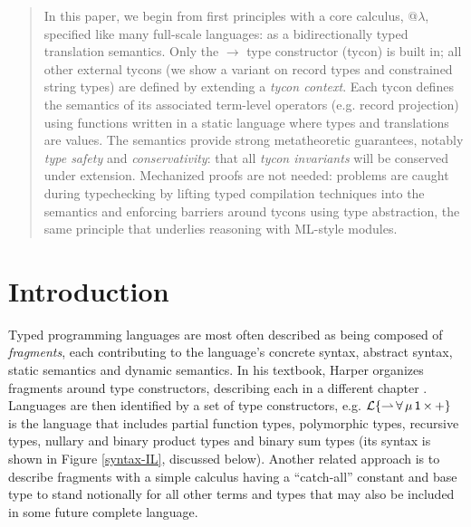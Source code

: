 \documentclass[10pt,preprint]{sigplanconf}
\begin{document}
\begin{abstract}
In this paper, we begin from first principles with a core calculus, @$\lambda$, specified like many full-scale languages: as a bidirectionally typed translation semantics. Only the $\rightarrow$ type constructor (tycon) is built in; all other external tycons (we show a variant on record types and constrained string types) are defined by extending a \emph{tycon context}. Each tycon defines the semantics of its associated term-level operators (e.g. record projection) using functions written in a static language where types and translations are values. The semantics provide  strong metatheoretic guarantees, notably \emph{type safety} and \emph{conservativity}: that all \emph{tycon  invariants} will be conserved under extension. Mechanized proofs are not needed: problems are caught during typechecking by lifting typed compilation techniques into the semantics and enforcing barriers around tycons using type abstraction, the same principle that underlies reasoning with ML-style modules.
\end{abstract}

\section{Introduction}\label{intro}
Typed programming languages are most often described as being composed of \emph{fragments}, each contributing to the language's concrete syntax, abstract syntax, static semantics and dynamic semantics. 
In his textbook, Harper organizes fragments around type constructors, describing each in a different chapter \cite{pfpl}. Languages are then identified by a set of type constructors, e.g. $\mathcal{L}\{{\rightharpoonup}\,{\forall}\,{\mu}\,{{\sf 1}}\,{\times}\,{+}\}$ is the language that includes partial function types, polymorphic types, recursive types, nullary and binary product types and binary sum types (its syntax is shown in Figure \ref{syntax-IL}, discussed below).
Another related approach is to describe fragments with a simple calculus having a ``catch-all'' constant and base type to stand notionally for all other terms and types that may also be included in some future complete language.
\end{document}
